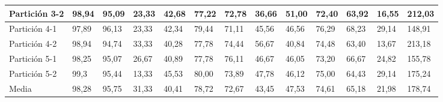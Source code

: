 \documentclass[10pt,a4paper]{article}
\begin{document}
\begin{table}[H]
{\begin{tabular}{l|l|l|l|l|l|l|l|l|l|l|l|l|}
\multicolumn{1}{|l|}{Partición 3-2} & 98,94        & 95,09         & 23,33   & 42,68 & 77,22        & 72,78         & 36,66   & 51,00 & 72,40        & 63,92         & 16,55   & 212,03 \\ \hline
\multicolumn{1}{|l|}{Partición 4-1} & 97,89        & 96,13         & 23,33   & 42,34 & 79,44        & 71,11         & 45,56   & 46,56 & 76,29        & 68,23         & 29,14   & 148,91 \\ \hline
\multicolumn{1}{|l|}{Partición 4-2} & 98,94        & 94,74         & 33,33   & 40,28 & 77,78        & 74,44         & 56,67   & 40,84 & 74,48        & 63,40         & 13,67   & 213,18 \\ \hline
\multicolumn{1}{|l|}{Partición 5-1} & 98,25        & 95,07         & 26,67   & 40,89 & 77,78        & 76,11         & 46,67   & 46,05 & 73,20        & 66,67         & 24,82   & 155,78 \\ \hline
\multicolumn{1}{|l|}{Partición 5-2} & 99,3         & 95,44         & 13,33   & 45,53 & 80,00        & 73,89         & 47,78   & 46,12 & 75,00        & 64,43         & 29,14   & 175,24 \\ \hline
\multicolumn{1}{|l|}{Media}         & 98,28        & 95,75         & 31,33   & 40,41 & 78,72        & 72,67         & 43,45   & 47,53 & 74,61        & 65,18         & 21,98   & 178,74 \\ \hline
\end{tabular}}
\end{table}

\begin{table}[H]
\centering
\caption{Resultados Totales}
\label{my-label}
\end{table}
\end{document}
